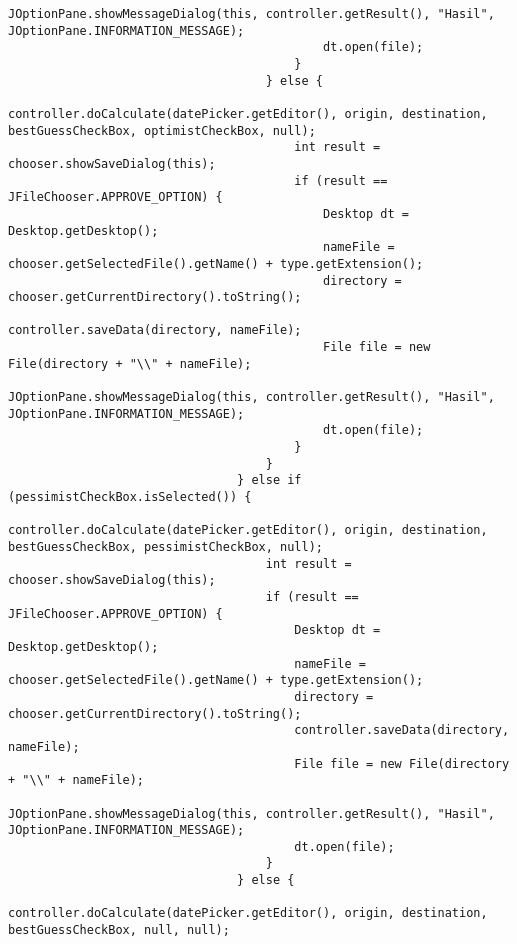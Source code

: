 \begin{lstlisting}[caption= main.java]
                                            JOptionPane.showMessageDialog(this, controller.getResult(), "Hasil", JOptionPane.INFORMATION_MESSAGE);
                                            dt.open(file);
                                        }
                                    } else {
                                        controller.doCalculate(datePicker.getEditor(), origin, destination, bestGuessCheckBox, optimistCheckBox, null);
                                        int result = chooser.showSaveDialog(this);
                                        if (result == JFileChooser.APPROVE_OPTION) {
                                            Desktop dt = Desktop.getDesktop();
                                            nameFile = chooser.getSelectedFile().getName() + type.getExtension();
                                            directory = chooser.getCurrentDirectory().toString();
                                            controller.saveData(directory, nameFile);
                                            File file = new File(directory + "\\" + nameFile);
                                            JOptionPane.showMessageDialog(this, controller.getResult(), "Hasil", JOptionPane.INFORMATION_MESSAGE);
                                            dt.open(file);
                                        }
                                    }
                                } else if (pessimistCheckBox.isSelected()) {
                                    controller.doCalculate(datePicker.getEditor(), origin, destination, bestGuessCheckBox, pessimistCheckBox, null);
                                    int result = chooser.showSaveDialog(this);
                                    if (result == JFileChooser.APPROVE_OPTION) {
                                        Desktop dt = Desktop.getDesktop();
                                        nameFile = chooser.getSelectedFile().getName() + type.getExtension();
                                        directory = chooser.getCurrentDirectory().toString();
                                        controller.saveData(directory, nameFile);
                                        File file = new File(directory + "\\" + nameFile);
                                        JOptionPane.showMessageDialog(this, controller.getResult(), "Hasil", JOptionPane.INFORMATION_MESSAGE);
                                        dt.open(file);
                                    }
                                } else {
                                    controller.doCalculate(datePicker.getEditor(), origin, destination, bestGuessCheckBox, null, null);

\end{lstlisting}
